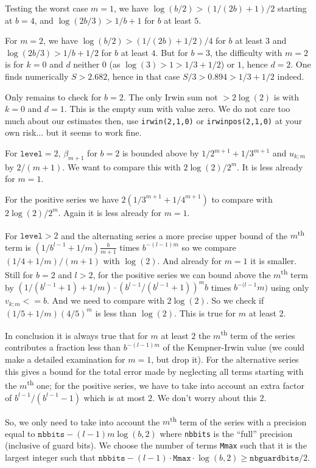 \documentclass[a4paper,french,dvipdfmx,11pt]{article}
\begin{document}
Testing the worst case $m=1$, we have $\log(b/2)>(1/(2b)+1)/2$ starting at
$b=4$, and $\log(2b/3)>1/b + 1$ for $b$ at least $5$.

For $m=2$, we have $\log(b/2)>(1/(2b)+1/2)/4$ for $b$ at least $3$ and
$\log(2b/3)>1/b+1/2$ for $b$ at least $4$.  But for $b=3$, the difficulty with
$m=2$ is for $k=0$ and $d$ neither $0$ (as $\log(3)>1>1/3+1/2$) or $1$,
hence $d=2$. One finds numerically $S>2.682$, hence in that case
$S/3>0.894>1/3+1/2$ indeed.

Only remains to check for $b=2$.  The only Irwin sum not $>2\log(2)$ is with
$k=0$ and $d=1$. This is the empty sum with value zero.  We do not care too
much about our estimates then, use
\texttt{irwin(2,1,0)} or \texttt{irwinpos(2,1,0)} at your own risk... but it
seems to work fine.

For $\mathtt{level}=2$, $\beta_{m+1}$ for $b=2$ is bounded above by
$1/2^{m+1}+1/3^{m+1}$ and $u_{k;m}$ by $2/(m+1)$.  We want to compare this
with $2 \log(2)/2^m$. It is less already for $m=1$.

For the positive series we have $2(1/3^{m+1}+1/4^{m+1})$ to compare with
$2\log(2)/2^m$. Again it is less already for $m=1$.

For $\mathtt{level}>2$ and the alternating series a more precise upper bound
of the $m$\textsuperscript{th} term is $(1/b^{l-1}+1/m)\frac{b}{m+1}$ times
$b^{-(l-1)m}$ so we compare $(1/4+1/m)/(m+1)$ with $\log(2)$.  And already for
$m=1$ it is smaller. Still for $b=2$ and $l>2$, for the positive series we can
bound above the $m$\textsuperscript{th} term by
$(1/(b^{l-1}+1)+1/m)\cdot(b^{l-1}/(b^{l-1}+1))^m b$ times $b^{-(l-1}m)$ using
only $v_{k;m}<= b$. And we need to compare with $2 \log(2)$. So we check if
$(1/5+1/m)(4/5)^m$ is less than $\log(2)$. This is true for $m$ at least $2$.

In conclusion it is always true that for $m$ at least $2$ the
$m$\textsuperscript{th} term of the series contributes a fraction less than
$b^{-(l-1)m}$ of the Kempner-Irwin value (we could make a detailed examination
for $m=1$, but drop it). For the alternative series this gives a bound for the
total error made by neglecting all terms starting with the
$m$\textsuperscript{th} one; for the positive series, we have to take into
account an extra factor of $b^{l-1}/(b^{l-1}-1)$ which is at most $2$.  We
don't worry about this $2$.

So, we only need to take into account the $m$\textsuperscript{th} term of the
series with a precision equal to $\mathtt{nbbits} - (l-1)m\log(b,2)$ where
\texttt{nbbits} is the ``full'' precision (inclusive of guard bits).  We
choose the number of terms \texttt{Mmax} such that it is the largest integer
such that $\mathtt{nbbits} - (l-1)\cdot\mathtt{Mmax}\cdot\log(b,2)\geq
\mathtt{nbguardbits}/2$.
\end{document}
